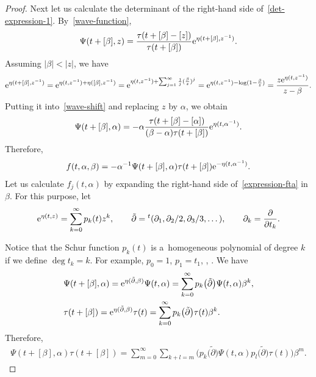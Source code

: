 \documentclass[pdftex]{sigma}
\numberwithin{equation}{section}
\theoremstyle{definition}
\begin{document}
\begin{proof}
Next let us calculate the determinant of the right-hand side of~\eqref{det-expression-1}.
By~\eqref{wave-function},
\begin{gather}
\Psi(t+[\beta],z)=\frac{\tau(t+[\beta]-[z])}{\tau(t+[\beta])}{\rm e}^{\eta(t+[\beta],z^{-1})}.
\label{wave-shift}
\end{gather}
Assuming $|\beta|<|z|$, we have
\begin{align*}
{\rm e}^{\eta(t+[\beta],z^{-1})}
=
{\rm e}^{\eta(t,z^{-1})+\eta([\beta],z^{-1})}
=
{\rm e}^{\eta(t,z^{-1})+\sum_{j=1}^\infty \frac{1}{j}(\frac{\beta}{z})^j}
=
{\rm e}^{\eta(t,z^{-1})-\log(1-\frac{\beta}{z})}
=
\frac{z{\rm e}^{\eta(t,z^{-1})}}{z-\beta}.
\end{align*}
Putting it into~\eqref{wave-shift} and replacing $z$ by $\alpha$, we obtain
\begin{gather*}
\Psi(t+[\beta],\alpha)=-\alpha \frac{\tau(t+[\beta]-[\alpha])}{(\beta-\alpha)\tau(t+[\beta])}
{\rm e}^{\eta(t,\alpha^{-1})}.
\end{gather*}
Therefore, \begin{gather}
f(t,\alpha,\beta)=-\alpha^{-1}\Psi(t+[\beta],\alpha)\tau(t+[\beta]){\rm e}^{-\eta(t,\alpha^{-1})}.
\label{expression-fta}
\end{gather}
Let us calculate $f_j(t,\alpha)$ by expanding the right-hand side of~\eqref{expression-fta}
 in $\beta$.
For this purpose, let
\begin{gather}
{\rm e}^{\eta(t,z)}=\sum_{k=0}^\infty p_k(t) z^k,
\qquad
\tilde{\partial}={}^t(\partial_1,\partial_2/2,\partial_3/3,\dots ),
 \qquad \partial_k=\frac{\partial}{\partial t_k}.\label{def-pk}
\end{gather}

Notice that the Schur function $p_k(t)$ is a~homogeneous polynomial of degree $k$ if we define
$\deg t_k=k$. For example,
$
p_0=1$,
$
p_1=t_1$,
,
.
We have
\begin{gather*}
\begin{split}
& \Psi(t+[\beta],\alpha)
=
{\rm e}^{\eta(\tilde{\partial},\beta)}\Psi(t,\alpha)=
\sum_{k=0}^\infty p_k\bigl(\tilde{\partial}\bigr)\Psi(t,\alpha)\beta^k,
\\
& \tau(t+[\beta])
=
{\rm e}^{\eta(\tilde{\partial},\beta)}\tau(t)=
\sum_{k=0}^\infty p_k\bigl(\tilde{\partial}\bigr)\tau(t)\beta^k.
\end{split}
\end{gather*}
Therefore, \begin{gather}
\Psi(t+[\beta],\alpha)\tau(t+[\beta])
=\sum_{m=0}^\infty \sum_{k+l=m}
\bigl(p_k\bigl(\tilde{\partial}\bigr)\Psi(t,\alpha) p_l\bigl(\tilde{\partial}\bigr)\tau(t)\bigr)\beta^m.
\label{expansion-product}
\end{gather}




\end{proof}
\end{document}
